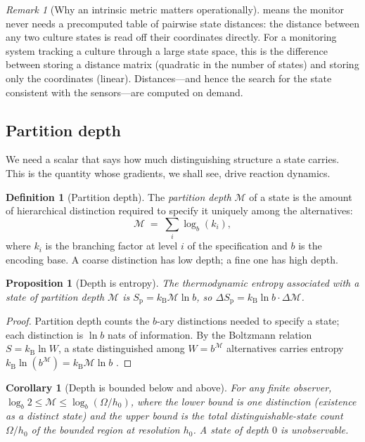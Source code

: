 \documentclass[11pt,twocolumn,a4paper]{article}
\theoremstyle{thmstyle}
\newtheorem{proposition}[theorem]{Proposition}
\newtheorem{corollary}[theorem]{Corollary}
\theoremstyle{definition}
\newtheorem{definition}[theorem]{Definition}
\theoremstyle{remark}
\newtheorem{remark}[theorem]{Remark}
\newcommand{\kB}{k_{\mathrm{B}}}
\newcommand{\Depth}{\mathcal{M}}
\begin{document}
\begin{remark}[Why an intrinsic metric matters operationally]
\label{rem:intrinsic}
 means the monitor never needs a precomputed table of
pairwise state distances: the distance between any two culture states is
read off their coordinates directly. For a monitoring system tracking a
culture through a large state space, this is the difference between storing
a distance matrix (quadratic in the number of states) and storing only the
coordinates (linear). Distances---and hence the search for the state
consistent with the sensors---are computed on demand.
\end{remark}

\subsection{Partition depth}

We need a scalar that says how much distinguishing structure a state
carries. This is the quantity whose gradients, we shall see, drive reaction
dynamics.

\begin{definition}[Partition depth]
\label{def:depth}
The \emph{partition depth} $\Depth$ of a state is the amount of
hierarchical distinction required to specify it uniquely among the
alternatives:
\[
\Depth\;=\;\sum_{i}\log_b(k_i),
\]
where $k_i$ is the branching factor at level $i$ of the specification and
$b$ is the encoding base. A coarse distinction has low depth; a fine one
has high depth.
\end{definition}

\begin{proposition}[Depth is entropy]
\label{prop:depth-entropy}
The thermodynamic entropy associated with a state of partition depth
$\Depth$ is $S_{\mathrm{p}}=\kB\Depth\ln b$, so
$\Delta S_{\mathrm{p}}=\kB\ln b\cdot\Delta\Depth$.
\end{proposition}

\begin{proof}
Partition depth counts the $b$-ary distinctions needed to specify a state;
each distinction is $\ln b$ nats of information. By the Boltzmann relation
$S=\kB\ln W$, a state distinguished among $W=b^{\Depth}$ alternatives
carries entropy $\kB\ln(b^{\Depth})=\kB\Depth\ln b$
\citep{shannon1948mathematical,cover2006elements}.
\end{proof}

\begin{corollary}[Depth is bounded below and above]
\label{cor:depth-bounds}
For any finite observer, $\log_b 2\le\Depth\le\log_b(\Omega/h_0)$, where the
lower bound is one distinction (existence as a distinct state) and the
upper bound is the total distinguishable-state count $\Omega/h_0$ of the
bounded region at resolution $h_0$. A state of depth $0$ is unobservable.
\end{corollary}
\end{document}
